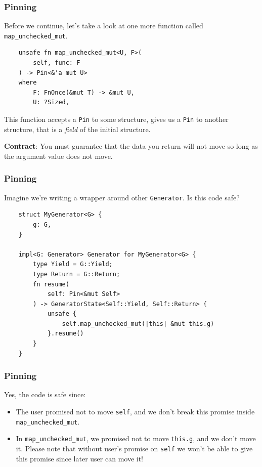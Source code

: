 \documentclass[aspectratio=1610,t]{beamer}
\begin{document}

\begin{frame}[fragile]
\frametitle{Pinning}
Before we continue, let's take a look at one more function called \texttt{map\_unchecked\_mut}.

\begin{verbatim}
    unsafe fn map_unchecked_mut<U, F>(
        self, func: F
    ) -> Pin<&'a mut U>
    where
        F: FnOnce(&mut T) -> &mut U,
        U: ?Sized,
\end{verbatim}

This function accepts a \texttt{Pin} to some structure, gives us a \texttt{Pin} to another structure, that is a \textit{field} of the initial structure.

\textbf{Contract}: You must guarantee that the data you return will not move so long as the argument value does not move.
\end{frame}


\begin{frame}[fragile]
\frametitle{Pinning}
Imagine we're writing a wrapper around other \texttt{Generator}. Is this code safe?

\begin{verbatim}
    struct MyGenerator<G> {
        g: G,
    }

    impl<G: Generator> Generator for MyGenerator<G> {
        type Yield = G::Yield;
        type Return = G::Return;
        fn resume(
            self: Pin<&mut Self>
        ) -> GeneratorState<Self::Yield, Self::Return> {
            unsafe {
                self.map_unchecked_mut(|this| &mut this.g)
            }.resume()
        }
    }
\end{verbatim}
\end{frame}


\begin{frame}[fragile]
\frametitle{Pinning}
Yes, the code is safe since:

\begin{itemize}
    \item The user promised not to move \texttt{self}, and we don't break this promise inside \texttt{map\_unchecked\_mut}.
    \item In \texttt{map\_unchecked\_mut}, we promised not to move \texttt{this.g}, and we don't move it. Please note that without user's promise on \texttt{self} we won't be able to give this promise since later user can move it!
\end{itemize}
\end{frame}
\end{document}
